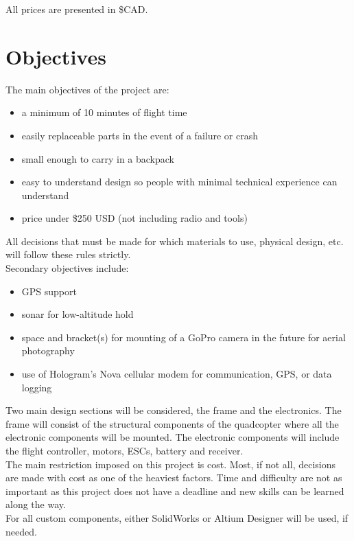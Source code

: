 \documentclass[12pt]{article}
\begin{document}
All prices are presented in \$CAD.

\section{Objectives}

The main objectives of the project are:
\renewcommand{\labelitemi}{\textperiodcentered}
\begin{itemize}
\item a minimum of 10 minutes of flight time
\item easily replaceable parts in the event of a failure or crash
\item small enough to carry in a backpack
\item easy to understand design so people with minimal technical experience can understand
\item price under \$250 USD (not including radio and tools)
\end{itemize}

All decisions that must be made for which materials to use, physical design, etc. will follow these rules strictly.
\\

Secondary objectives include:
\renewcommand{\labelitemi}{\textperiodcentered}
\begin{itemize}
\item GPS support
\item sonar for low-altitude hold
\item space and bracket(s) for mounting of a GoPro camera in the future for aerial photography
\item use of Hologram's Nova cellular modem for communication, GPS, or data logging
\end{itemize}

Two main design sections will be considered, the frame and the electronics. The frame will consist of the structural components of the quadcopter where all the electronic components will be mounted. The electronic components will include the flight controller, motors, ESCs, battery and receiver. 
\\

The main restriction imposed on this project is cost. Most, if not all, decisions are made with cost as one of the heaviest factors. Time and difficulty are not as important as this project does not have a deadline and new skills can be learned along the way.
\\

For all custom components, either SolidWorks or Altium Designer will be used, if needed.
\end{document}
